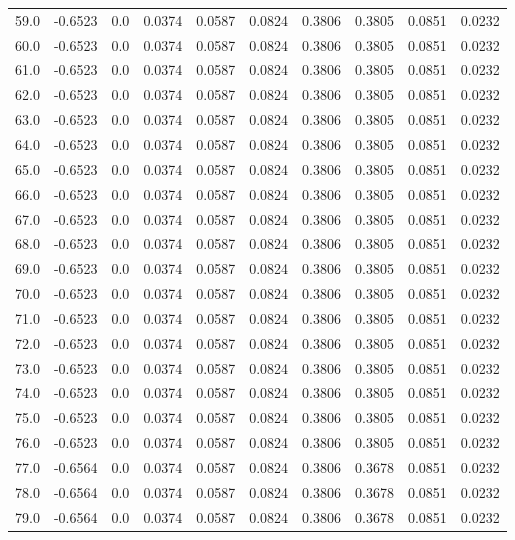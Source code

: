 \begin{longtable}{lrrrrrrrrr}
59.0 & -0.6523 & 0.0 & 0.0374 & 0.0587 & 0.0824 & 0.3806 & 0.3805 & 0.0851 & 0.0232 \\
60.0 & -0.6523 & 0.0 & 0.0374 & 0.0587 & 0.0824 & 0.3806 & 0.3805 & 0.0851 & 0.0232 \\
61.0 & -0.6523 & 0.0 & 0.0374 & 0.0587 & 0.0824 & 0.3806 & 0.3805 & 0.0851 & 0.0232 \\
62.0 & -0.6523 & 0.0 & 0.0374 & 0.0587 & 0.0824 & 0.3806 & 0.3805 & 0.0851 & 0.0232 \\
63.0 & -0.6523 & 0.0 & 0.0374 & 0.0587 & 0.0824 & 0.3806 & 0.3805 & 0.0851 & 0.0232 \\
64.0 & -0.6523 & 0.0 & 0.0374 & 0.0587 & 0.0824 & 0.3806 & 0.3805 & 0.0851 & 0.0232 \\
65.0 & -0.6523 & 0.0 & 0.0374 & 0.0587 & 0.0824 & 0.3806 & 0.3805 & 0.0851 & 0.0232 \\
66.0 & -0.6523 & 0.0 & 0.0374 & 0.0587 & 0.0824 & 0.3806 & 0.3805 & 0.0851 & 0.0232 \\
67.0 & -0.6523 & 0.0 & 0.0374 & 0.0587 & 0.0824 & 0.3806 & 0.3805 & 0.0851 & 0.0232 \\
68.0 & -0.6523 & 0.0 & 0.0374 & 0.0587 & 0.0824 & 0.3806 & 0.3805 & 0.0851 & 0.0232 \\
69.0 & -0.6523 & 0.0 & 0.0374 & 0.0587 & 0.0824 & 0.3806 & 0.3805 & 0.0851 & 0.0232 \\
70.0 & -0.6523 & 0.0 & 0.0374 & 0.0587 & 0.0824 & 0.3806 & 0.3805 & 0.0851 & 0.0232 \\
71.0 & -0.6523 & 0.0 & 0.0374 & 0.0587 & 0.0824 & 0.3806 & 0.3805 & 0.0851 & 0.0232 \\
72.0 & -0.6523 & 0.0 & 0.0374 & 0.0587 & 0.0824 & 0.3806 & 0.3805 & 0.0851 & 0.0232 \\
73.0 & -0.6523 & 0.0 & 0.0374 & 0.0587 & 0.0824 & 0.3806 & 0.3805 & 0.0851 & 0.0232 \\
74.0 & -0.6523 & 0.0 & 0.0374 & 0.0587 & 0.0824 & 0.3806 & 0.3805 & 0.0851 & 0.0232 \\
75.0 & -0.6523 & 0.0 & 0.0374 & 0.0587 & 0.0824 & 0.3806 & 0.3805 & 0.0851 & 0.0232 \\
76.0 & -0.6523 & 0.0 & 0.0374 & 0.0587 & 0.0824 & 0.3806 & 0.3805 & 0.0851 & 0.0232 \\
77.0 & -0.6564 & 0.0 & 0.0374 & 0.0587 & 0.0824 & 0.3806 & 0.3678 & 0.0851 & 0.0232 \\
78.0 & -0.6564 & 0.0 & 0.0374 & 0.0587 & 0.0824 & 0.3806 & 0.3678 & 0.0851 & 0.0232 \\
79.0 & -0.6564 & 0.0 & 0.0374 & 0.0587 & 0.0824 & 0.3806 & 0.3678 & 0.0851 & 0.0232 \\

\end{longtable}
